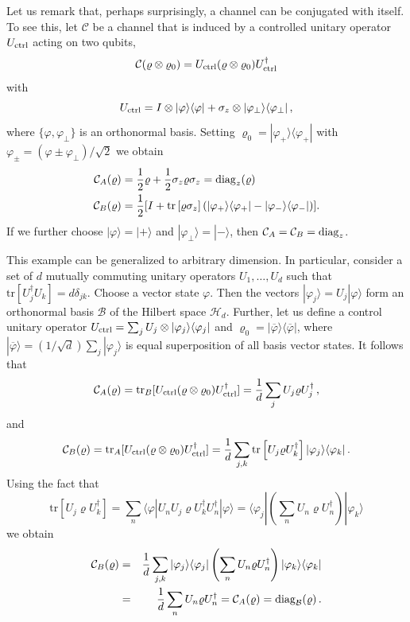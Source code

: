 \documentclass[12pt]{iopart}
\theoremstyle{definition}
\newcommand{\ket}[1]{|#1\rangle} %
\newcommand{\bra}[1]{\langle#1|} %
\renewcommand{\tr}[1]{\textrm{tr}\left[#1\right]} %
\newcommand{\Cc}{\mathcal{C}} %
\begin{document}
{Let us remark that, perhaps surprisingly, a channel can be conjugated 
with itself. To see this, let $\Cc$ be a channel that is induced by a controlled unitary operator $U_{\rm ctrl}$ acting on two qubits,
\begin{equation}
\Cc(\varrho\otimes\varrho_0)=
U_{\rm ctrl}(\varrho\otimes\varrho_0)U_{\rm ctrl}^\dagger
\end{equation}
 with
\begin{equation}
U_{\rm ctrl}=I\otimes\ket{\varphi}\bra{\varphi}+\sigma_z\otimes\ket{\varphi_\perp}\bra{\varphi_\perp} \, ,
\end{equation}
where $\{\varphi,\varphi_\perp\}$ is an orthonormal basis. 
Setting $\varrho_0=\ket{\varphi_+}\bra{\varphi_+}$ with
$\varphi_{\pm}=(\varphi\pm\varphi_\perp)/\sqrt{2}$ we obtain
\begin{align}
\Cc_A(\varrho)&=\frac{1}{2}\varrho+\frac{1}{2}\sigma_z\varrho\sigma_z=
{\rm diag}_z(\varrho)\\
\Cc_B(\varrho)&=\frac{1}{2}[I+\tr{\varrho\sigma_z}
(\ket{\varphi_+}\bra{\varphi_+}-\ket{\varphi_-}\bra{\varphi_-})].
\end{align}
If we further choose $\ket{\varphi}=\ket{+}$ and $\ket{\varphi_\perp}=\ket{-}$, 
then $\Cc_A=\Cc_B={\rm diag}_z$. 

This example can be generalized to arbitrary dimension. In particular, consider
a set of $d$ mutually commuting unitary operators $U_1,\dots,U_d$ such that
$\tr{U_j^\dagger U_k}=d\delta_{jk}$. Choose a vector state $\varphi$. Then
the vectors $\ket{\varphi_j}=U_j\ket{\varphi}$ form an orthonormal basis 
$\mathcal{B}$
of the Hilbert space $\mathcal{H}_d$. Further, let us define a control unitary
operator $U_{\rm ctrl}=\sum_j U_j\otimes\ket{\varphi_j}\bra{\varphi_j}$ and
$\varrho_0=\ket{\overline{\varphi}}\bra{\overline{\varphi}}$, where
$\ket{\overline{\varphi}}=(1/\sqrt{d})\sum_j\ket{\varphi_j}$ is equal
superposition of all basis vector states. 
It follows that
\begin{equation}
\Cc_A(\varrho)={\rm tr}_B[U_{\rm ctrl}(\varrho\otimes\varrho_0)U_{\rm ctrl}^\dagger]=
\frac{1}{d}\sum_j U_j\varrho U_j^\dagger\,,
\end{equation}
and
\begin{equation}
\Cc_B(\varrho)={\rm tr}_A[U_{\rm ctrl}(\varrho\otimes\varrho_0)U_{\rm ctrl}^\dagger]=
\frac{1}{d}\sum_{j,k}\tr{U_j\varrho U_k^\dagger}\ket{\varphi_j}\bra{\varphi_k}\,.
\end{equation}
Using the fact that 
\begin{equation}
\tr{U_j\varrho U_k^\dagger}=
\sum_n \bra{\varphi} U_n U_j\varrho U_k^\dagger U_n^\dagger\ket{\varphi}
= \bra{\varphi_j}\left(\sum_n U_n\varrho U_n^\dagger\right)\ket{\varphi_k}
\end{equation}
we obtain
\begin{eqnarray*}
\Cc_B(\varrho)&=&\frac{1}{d}\sum_{j,k} \ket{\varphi_j}\bra{\varphi_j}
\left(\sum_n U_n\varrho U_n^\dagger\right)\ket{\varphi_k}\bra{\varphi_k}
\\ &=&\frac{1}{d}\sum_n U_n\varrho U_n^\dagger = \Cc_A (\varrho)
= {\rm diag}_{\mathcal{B}}(\varrho)\,.
\end{eqnarray*}

}
\end{document}
